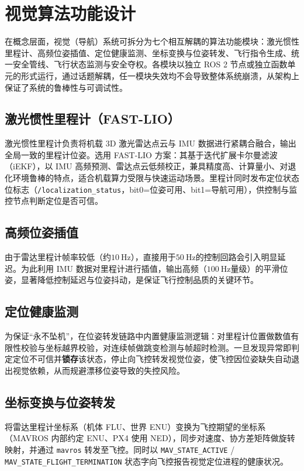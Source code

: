 \section{视觉算法功能设计}
在概念层面，视觉（导航）系统可拆分为七个相互解耦的算法功能模块：激光惯性里程计、高频位姿插值、定位健康监测、坐标变换与位姿转发、飞行指令生成、统一安全管线、飞行状态监测与安全夺权。各模块以独立 ROS 2 节点或独立函数单元的形式运行，通过话题解耦，任一模块失效均不会导致整体系统崩溃，从架构上保证了系统的鲁棒性与可调试性。

\subsection{激光惯性里程计（FAST-LIO）}
激光惯性里程计负责将机载 3D 激光雷达点云与 IMU 数据进行紧耦合融合，输出全局一致的里程计位姿。选用 FAST-LIO 方案：其基于迭代扩展卡尔曼滤波（iEKF），以 IMU 高频预测、雷达点云低频校正，兼具精度高、计算量小、对退化环境鲁棒的特点，适合机载算力受限与快速运动场景。里程计同时发布定位状态位标志（\lstinline{/localization_status}，bit0=位姿可用、bit1=导航可用），供控制与监控节点判断定位是否可信。

\subsection{高频位姿插值}
由于雷达里程计帧率较低（约$\qty{10}{\Hz}$），直接用于$\qty{50}{\Hz}$的控制回路会引入明显延迟。为此利用 IMU 数据对里程计进行插值，输出高频（$\qty{100}{\Hz}$量级）的平滑位姿，显著降低控制延迟与位姿抖动，是保证飞行控制品质的关键环节。

\subsection{定位健康监测}
为保证“永不坠机”，在位姿转发链路中内置健康监测逻辑：对里程计位置做数值有限性校验与坐标越界校验，对连续帧做跳变检测与帧超时检测。一旦发现异常即判定定位不可信并\textbf{锁存}该状态，停止向飞控转发视觉位姿，使飞控因位姿缺失自动退出视觉依赖，从而规避漂移位姿导致的失控风险。

\subsection{坐标变换与位姿转发}
将雷达里程计坐标系（机体 FLU、世界 ENU）变换为飞控期望的坐标系（MAVROS 内部约定 ENU、PX4 使用 NED），同步对速度、协方差矩阵做旋转映射，并通过 \lstinline{mavros} 转发至飞控。同时以 \lstinline{MAV_STATE_ACTIVE} / \lstinline{MAV_STATE_FLIGHT_TERMINATION} 状态字向飞控报告视觉定位进程的健康状况。

